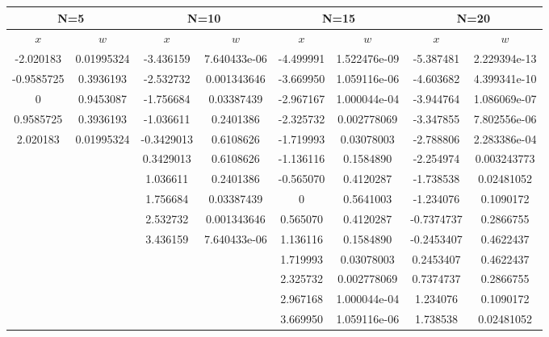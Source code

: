 \documentclass[UTF8]{ctexart}
\begin{document}
\begin{table}[H]
    \centering
    \begin{tabular}{|c|c|c|c|c|c|c|c|}
    \hline
    \multicolumn{2}{|c|}{N=5} & \multicolumn{2}{c}{N=10} & \multicolumn{2}{|c|}{N=15} & \multicolumn{2}{|c|}{N=20} \\
    \hline
    $x$          & $w$          & $x$           & $w$          & $x$           & $w$          & $x$           & $w$          \\
    \hline
    -2.020183 & 0.01995324 & -3.436159 & 7.640433e-06    & -4.499991 & 1.522476e-09    & -5.387481  & 2.229394e-13    \\
    -0.9585725& 0.3936193 & -2.532732 & 0.001343646 & -3.669950 & 1.059116e-06    & -4.603682  & 4.399341e-10    \\
    0           & 0.9453087  & -1.756684 & 0.03387439 & -2.967167 & 1.000044e-04    & -3.944764  & 1.086069e-07    \\
    0.9585725 & 0.3936193 & -1.036611 & 0.2401386 & -2.325732 & 0.002778069 & -3.347855 & 7.802556e-06    \\
    2.020183  & 0.01995324 & -0.3429013 & 0.6108626 & -1.719993 & 0.03078003 & -2.788806 & 2.283386e-04    \\
                &             & 0.3429013  & 0.6108626 & -1.136116 & 0.1584890 & -2.254974 & 0.003243773 \\
                &             & 1.036611  & 0.2401386 & -0.565070 & 0.4120287 & -1.738538 & 0.02481052 \\
                &             & 1.756684  & 0.03387439 & 0            & 0.5641003 & -1.234076 & 0.1090172 \\
                &             & 2.532732  & 0.001343646 & 0.565070  & 0.4120287 & -0.7374737 & 0.2866755 \\
                &             & 3.436159  & 7.640433e-06    & 1.136116  & 0.1584890 & -0.2453407 & 0.4622437  \\
                &             &              &             & 1.719993  & 0.03078003 & 0.2453407  & 0.4622437  \\
                &             &              &             & 2.325732  & 0.002778069 & 0.7374737  & 0.2866755 \\
                &             &              &             & 2.967168  & 1.000044e-04    & 1.234076  & 0.1090172 \\
                &             &              &             & 3.669950  & 1.059116e-06    & 1.738538  & 0.02481052 \\

\end{tabular}
\end{table}
\end{document}
